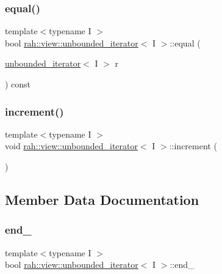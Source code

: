 \subsubsection{\texorpdfstring{equal()}{equal()}}
{\footnotesize\ttfamily template$<$typename I $>$ \\
bool \mbox{\hyperlink{structrah_1_1view_1_1unbounded__iterator}{rah\+::view\+::unbounded\+\_\+iterator}}$<$ I $>$\+::equal (\begin{DoxyParamCaption}\item[{\mbox{\hyperlink{structrah_1_1view_1_1unbounded__iterator}{unbounded\+\_\+iterator}}$<$ I $>$}]{r }\end{DoxyParamCaption}) const\hspace{0.3cm}{\ttfamily [inline]}}

\mbox{\label{structrah_1_1view_1_1unbounded__iterator_a903c96112b62831505ba8c7af80f6263}} 
\subsubsection{\texorpdfstring{increment()}{increment()}}
{\footnotesize\ttfamily template$<$typename I $>$ \\
void \mbox{\hyperlink{structrah_1_1view_1_1unbounded__iterator}{rah\+::view\+::unbounded\+\_\+iterator}}$<$ I $>$\+::increment (\begin{DoxyParamCaption}{ }\end{DoxyParamCaption})\hspace{0.3cm}{\ttfamily [inline]}}



\subsection{Member Data Documentation}
\mbox{\label{structrah_1_1view_1_1unbounded__iterator_a5af8d60be5952969ccbad7ef9ce670e4}} 
\subsubsection{\texorpdfstring{end\_}{end\_}}
{\footnotesize\ttfamily template$<$typename I $>$ \\
bool \mbox{\hyperlink{structrah_1_1view_1_1unbounded__iterator}{rah\+::view\+::unbounded\+\_\+iterator}}$<$ I $>$\+::end\+\_\+}

